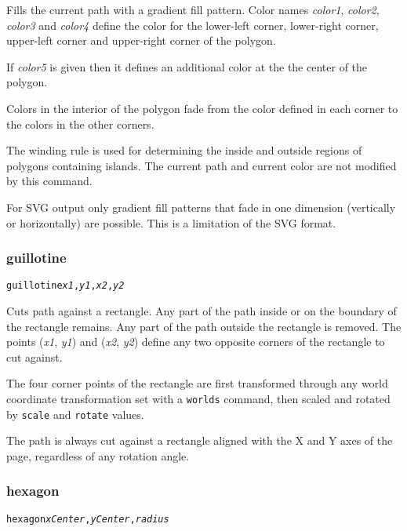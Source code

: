 Fills the current path with a gradient fill pattern.
Color names \textit{color1}, \textit{color2}, \textit{color3} and
\textit{color4} define the color for the lower-left corner,
lower-right corner, upper-left corner and upper-right corner of
the polygon.

If \textit{color5} is given then it defines an additional color at the
the center of the polygon.

Colors in the interior of the polygon fade from the color defined
in each corner to the colors in the other corners.

The winding rule is used for determining the inside and outside
regions of polygons containing islands.
The current path and current color are not modified by this command.

For SVG output only gradient fill patterns that fade in one dimension
(vertically or horizontally) are possible.  This is a limitation
of the SVG format.

\subsubsection{guillotine}

\begin{alltt}
guillotine \textit{x1}, \textit{y1}, \textit{x2}, \textit{y2}
\end{alltt}

Cuts path against a rectangle.
Any part of the path inside or
on the boundary of the rectangle remains.
Any part of the path outside the rectangle is removed.
The points
(\textit{x1}, \textit{y1}) and (\textit{x2}, \textit{y2}) define
any two opposite corners of the rectangle to cut against.

The four corner points of the rectangle
are first transformed through any world coordinate
transformation set with a \texttt{worlds} command,
then scaled and rotated by \texttt{scale}
and \texttt{rotate} values.

The path is always cut against a rectangle
aligned with the X and Y axes of the page, regardless of any rotation angle.

\subsubsection{hexagon}

\begin{alltt}
hexagon \textit{xCenter}, \textit{yCenter}, \textit{radius}
\end{alltt}

